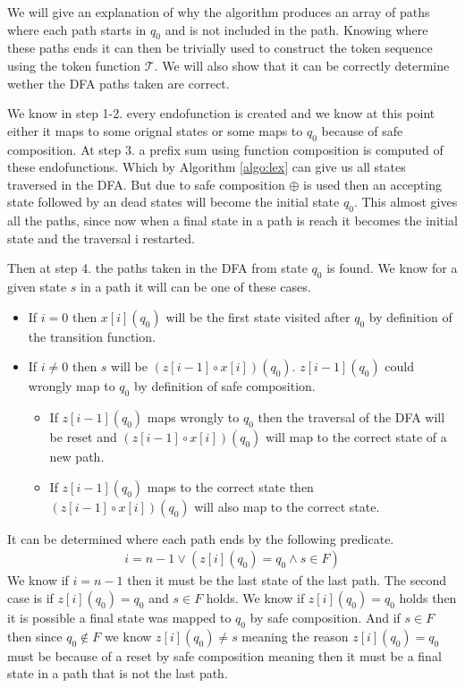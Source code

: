 \documentclass[a4paper,12pt]{article}
\theoremstyle{definition}
\begin{document}
\noindent We will give an explanation of why the algorithm produces an array of paths where each path starts in $q_0$ and is not included in the path. Knowing where these paths ends it can then be trivially used to construct the token sequence using the token function $\mathcal{T}$. We will also show that it can be correctly determine wether the DFA paths taken are correct.

We know in step 1-2. every endofunction is created and we know at this point either it maps to some orignal states or some maps to $q_0$ because of safe composition. At step 3. a prefix sum using function composition is computed of these endofunctions. Which by Algorithm \ref{algo:lex} can give us all states traversed in the DFA. But due to safe composition $\oplus$ is used then an accepting state followed by an dead states will become the initial state $q_0$. This almost gives all the paths, since now when a final state in a path is reach it becomes the initial state and the traversal i restarted.

Then at step 4. the paths taken in the DFA from state $q_0$ is found. We know for a given state $s$ in a path it will can be one of these cases.
\begin{itemize}
  \item If $i = 0$ then $x[i](q_0)$ will be the first state visited after $q_0$ by definition of the transition function.
  \item If $i \neq 0$ then $s$ will be $(z[i - 1] \circ x[i])(q_0)$. $z[i - 1](q_0)$ could wrongly map to $q_0$ by definition of safe composition.
  \begin{itemize}
    \item If $z[i - 1](q_0)$ maps wrongly to $q_0$ then the traversal of the DFA will be reset and $(z[i - 1] \circ x[i])(q_0)$ will map to the correct state of a new path.
    \item If $z[i - 1](q_0)$ maps to the correct state then $(z[i - 1] \circ x[i])(q_0)$ will also map to the correct state.
  \end{itemize}
\end{itemize}
It can be determined where each path ends by the following predicate.
\begin{align*}
  i = n - 1 \lor (z[i](q_0) = q_0 \land s \in F)
\end{align*}
We know if $i = n - 1$ then it must be the last state of the last path. The second case is if $z[i](q_0) = q_0$ and $s \in F$ holds. We know if $z[i](q_0) = q_0$ holds then it is possible a final state was mapped to $q_0$ by safe composition. And if $s \in F$ then since $q_0 \notin F$ we know $z[i](q_0) \neq s$ meaning the reason $z[i](q_0) = q_0$ must be because of a reset by safe composition meaning then it must be a final state in a path that is not the last path.
\end{document}
